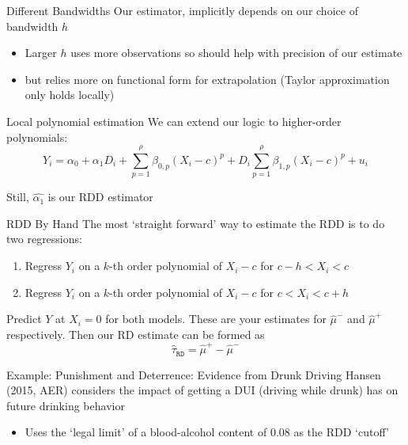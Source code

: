\documentclass[aspectratio=169,t,11pt,table]{beamer}
\begin{document}
\begin{frame}{Different Bandwidths}{}
  Our estimator, implicitly depends on our choice of bandwidth $h$
  \begin{itemize}
    \item Larger $h$ uses more observations so should help with precision of our estimate
    \item but relies more on functional form for extrapolation (Taylor approximation only holds locally)
  \end{itemize}
\end{frame}


\begin{frame}{Local polynomial estimation}{}
  We can extend our logic to higher-order polynomials:
  $$
    Y_i = \alpha_0 + \alpha_1 D_i + \sum_{p = 1}^\rho \beta_{0,p} (X_i - c)^p + D_i \sum_{p = 1}^\rho \beta_{1,p} (X_i - c)^p + u_i
  $$
  
  Still, $\hat{\alpha_1}$ is our RDD estimator
\end{frame}


\begin{frame}{RDD By Hand}{}
  The most `straight forward' way to estimate the RDD is to do two regressions:
  \begin{enumerate}
    \item Regress $Y_i$ on a $k$-th order polynomial of $X_i - c$ for $c - h < X_i < c$
    \item Regress $Y_i$ on a $k$-th order polynomial of $X_i - c$ for $c < X_i < c + h$
  \end{enumerate}

  \bigskip
  Predict $Y$ at $X_i = 0$ for both models. These are your estimates for $\hat{\mu}^-$ and $\hat{\mu}^+$ respectively. Then our RD estimate can be formed as
  $$
    \hat{\tau}_{\texttt{RD}} = \hat{\mu}^+ - \hat{\mu}^-
  $$
\end{frame}


\begin{frame}{Example: Punishment and Deterrence: Evidence from Drunk Driving}
  Hansen (2015, AER) considers the impact of getting a DUI (driving while drunk) has on future drinking behavior
  \begin{itemize}
    \item Uses the `legal limit' of a blood-alcohol content of 0.08 as the RDD `cutoff'
  \end{itemize}
\end{frame}
\end{document}

